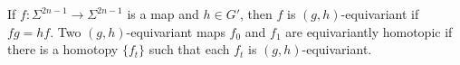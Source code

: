 If $f: \Sigma^{2n-1} \to \Sigma^{2n-1}$ is a map and $h \in G'$, then $f$ is $(g, h)$-equivariant if $fg = hf$. Two $(g, h)$-equivariant maps $f_0$ and $f_1$ are equivariantly homotopic if there is a homotopy $\{f_t\}$ such that each $f_t$ is $(g, h)$-equivariant.
